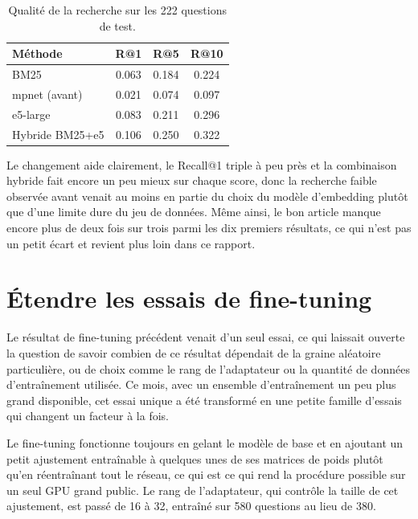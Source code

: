 \documentclass[11pt, a4paper]{article}
\begin{document}
\begin{table}[H]
\centering
\small
\begin{tabular}{lccc}
\toprule
\textbf{M\'ethode} & \textbf{R@1} & \textbf{R@5} & \textbf{R@10} \\
\midrule
BM25 & 0.063 & 0.184 & 0.224 \\
mpnet (avant) & 0.021 & 0.074 & 0.097 \\
e5-large & 0.083 & 0.211 & 0.296 \\
Hybride BM25+e5 & 0.106 & 0.250 & 0.322 \\
\bottomrule
\end{tabular}
\caption{Qualit\'e de la recherche sur les 222 questions de test.}
\label{tab:retrieval}
\end{table}

Le changement aide clairement, le Recall@1 triple \`a peu pr\`es et la combinaison hybride fait encore un peu mieux sur chaque score, donc la recherche faible observ\'ee avant venait au moins en partie du choix du mod\`ele d'embedding plut\^ot que d'une limite dure du jeu de donn\'ees. M\^eme ainsi, le bon article manque encore plus de deux fois sur trois parmi les dix premiers r\'esultats, ce qui n'est pas un petit \'ecart et revient plus loin dans ce rapport.

\section{\'Etendre les essais de fine-tuning}

Le r\'esultat de fine-tuning pr\'ec\'edent venait d'un seul essai, ce qui laissait ouverte la question de savoir combien de ce r\'esultat d\'ependait de la graine al\'eatoire particuli\`ere, ou de choix comme le rang de l'adaptateur ou la quantit\'e de donn\'ees d'entra\^inement utilis\'ee. Ce mois, avec un ensemble d'entra\^inement un peu plus grand disponible, cet essai unique a \'et\'e transform\'e en une petite famille d'essais qui changent un facteur \`a la fois.

Le fine-tuning fonctionne toujours en gelant le mod\`ele de base et en ajoutant un petit ajustement entra\^inable \`a quelques unes de ses matrices de poids plut\^ot qu'en r\'eentra\^inant tout le r\'eseau, ce qui est ce qui rend la proc\'edure possible sur un seul GPU grand public. Le rang de l'adaptateur, qui contr\^ole la taille de cet ajustement, est pass\'e de 16 \`a 32, entra\^in\'e sur 580 questions au lieu de 380.
\end{document}
